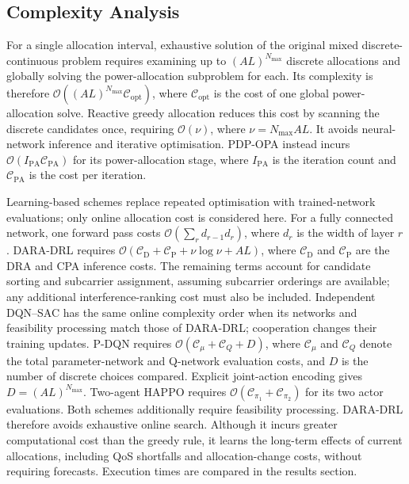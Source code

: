 \documentclass[journal]{IEEEtran}
\begin{document}
\subsection{Complexity Analysis}
For a single allocation interval, exhaustive
solution of the original mixed discrete-continuous problem
requires examining up to $(AL)^{N_{\max}}$ discrete allocations and globally solving the power-allocation subproblem for each. Its complexity is therefore
$\mathcal{O}((AL)^{N_{\max}}\mathcal{C}_{\mathrm{opt}})$,
where $\mathcal{C}_{\mathrm{opt}}$ is the cost of one global power-allocation solve. Reactive greedy allocation reduces this cost by scanning
the discrete candidates once, requiring
$\mathcal{O}(\nu)$, where $\nu=N_{\max}AL$.
It avoids neural-network inference and iterative optimisation.
PDP-OPA instead incurs
$\mathcal{O}(I_{\mathrm{PA}}\mathcal{C}_{\mathrm{PA}})$
for its power-allocation stage, where $I_{\mathrm{PA}}$
is the iteration count and $\mathcal{C}_{\mathrm{PA}}$
is the cost per iteration.

Learning-based schemes replace repeated optimisation with
trained-network evaluations; only online allocation cost is
considered here. For a fully connected network, one forward
pass costs $\mathcal{O}(\sum_r d_{r-1}d_r)$, where $d_r$
is the width of layer $r$. DARA-DRL requires
$\mathcal{O}(\mathcal{C}_{\mathrm{D}}
+\mathcal{C}_{\mathrm{P}}+\nu\log\nu+AL)$,
where $\mathcal{C}_{\mathrm{D}}$ and
$\mathcal{C}_{\mathrm{P}}$ are the DRA and CPA inference
costs. The remaining terms account for candidate sorting
and subcarrier assignment, assuming subcarrier orderings
are available; any additional interference-ranking cost
must also be included. Independent DQN--SAC has the same online complexity order
when its networks and feasibility processing match those
of DARA-DRL; cooperation changes their training updates.
P-DQN requires
$\mathcal{O}(\mathcal{C}_{\mu}+\mathcal{C}_{Q}+D)$,
where $\mathcal{C}_{\mu}$ and $\mathcal{C}_{Q}$ denote
the total parameter-network and Q-network evaluation costs,
and $D$ is the number of discrete choices compared.
Explicit joint-action encoding gives $D=(AL)^{N_{\max}}$.
Two-agent HAPPO requires
$\mathcal{O}(\mathcal{C}_{\pi_1}+\mathcal{C}_{\pi_2})$
for its two actor evaluations. Both schemes additionally
require feasibility processing. DARA-DRL therefore avoids exhaustive online search.
Although it incurs greater computational cost than the
greedy rule, it learns the long-term effects of current
allocations, including QoS shortfalls and allocation-change
costs, without requiring forecasts. Execution times are
compared in the results section.
\end{document}
